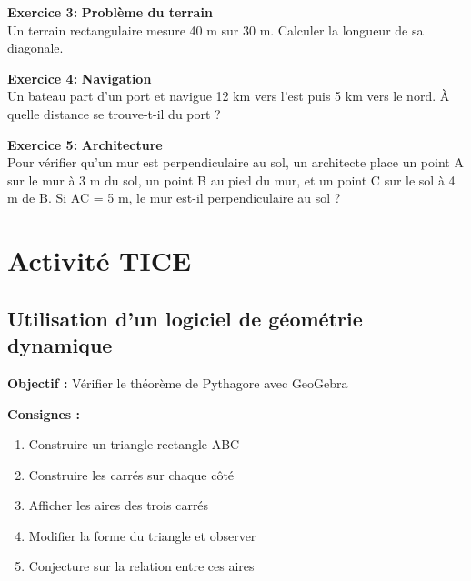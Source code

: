 \begin{exercisebox}
\textbf{Exercice 3:}
\textbf{Problème du terrain}\\
Un terrain rectangulaire mesure 40 m sur 30 m. Calculer la longueur de sa diagonale.

\textbf{Exercice 4:}
\textbf{Navigation}\\
Un bateau part d'un port et navigue 12 km vers l'est puis 5 km vers le nord. À quelle distance se trouve-t-il du port ?

\textbf{Exercice 5:}
\textbf{Architecture}\\
Pour vérifier qu'un mur est perpendiculaire au sol, un architecte place un point A sur le mur à 3 m du sol, un point B au pied du mur, et un point C sur le sol à 4 m de B. Si AC = 5 m, le mur est-il perpendiculaire au sol ?
\end{exercisebox}

\section{Activité TICE}

\subsection{Utilisation d'un logiciel de géométrie dynamique}

\textbf{Objectif :} Vérifier le théorème de Pythagore avec GeoGebra

\textbf{Consignes :}
\begin{enumerate}
    \item Construire un triangle rectangle ABC
    \item Construire les carrés sur chaque côté
    \item Afficher les aires des trois carrés
    \item Modifier la forme du triangle et observer
    \item Conjecture sur la relation entre ces aires
\end{enumerate}

